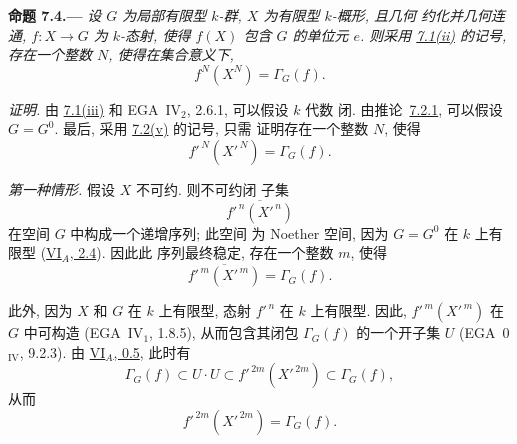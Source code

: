 
\medskip
{}\label{prop:sga3-VIB-7.4}%
\noindent\textbf{命题 7.4.---}
\emph{设 \(G\) 为局部有限型 \(k\)-群,
\(X\) 为有限型 \(k\)-概形, 且几何
约化并几何连通, \(f:X\to G\) 为
\(k\)-态射, 使得 \(f(X)\) 包含 \(G\) 的单位元
\(e\). 则采用
\hyperref[concl:sga3-VIB-7.1-ii]{7.1\textup{(ii)}} 的记号,
存在一个整数 \(N\), 使得在集合意义下,}
\label{form:sga3-VIB-7.4-stabilization}%
\[
  f^N(X^N)=\Gamma_G(f).
\]

\emph{证明.}
由 \hyperref[concl:sga3-VIB-7.1-iii]{7.1\textup{(iii)}} 和
EGA~IV\(_2\), 2.6.1, 可以假设 \(k\) 代数
闭. 由推论~\hyperref[cor:sga3-VIB-7.2.1]{7.2.1}, 可以假设
\(G=G^0\). 最后, 采用
\hyperref[rem:sga3-VIB-7.2-v]{7.2\textup{(v)}} 的记号, 只需
证明存在一个整数 \(N\), 使得
\[
  f'^{\,N}(X'^{\,N})=\Gamma_G(f).
\]

\emph{第一种情形.}
假设 \(X\) 不可约. 则不可约闭
子集
\[
  \overline{f'^{\,n}(X'^{\,n})}
\]
在空间 \(G\) 中构成一个递增序列; 此空间
为 Noether 空间, 因为 \(G=G^0\) 在 \(k\) 上有限型
(\hyperref[prop:sga3-VIA-2.4]{VI\(_A\), 2.4}). 因此此
序列最终稳定, 存在一个整数 \(m\), 使得
\[
  \overline{f'^{\,m}(X'^{\,m})}=\Gamma_G(f).
\]

此外, 因为 \(X\) 和 \(G\) 在 \(k\) 上有限型,
态射 \(f'^{\,n}\) 在 \(k\) 上有限型.
因此, \(f'^{\,m}(X'^{\,m})\) 在
\(G\) 中可构造 (EGA~IV\(_1\), 1.8.5), 从而包含其闭包
\(\Gamma_G(f)\) 的一个开子集 \(U\)
(EGA~0\(_{\mathrm{IV}}\), 9.2.3). 由
\hyperref[sga3:VIA:0.5]{VI\(_A\), 0.5}, 此时有
\label{form:sga3-VIB-7.4-first-case-chain}%
\[
  \Gamma_G(f)
  \subset U\cdot U
  \subset f'^{\,2m}(X'^{\,2m})
  \subset \Gamma_G(f),
\]
从而
\[
  f'^{\,2m}(X'^{\,2m})=\Gamma_G(f).
\]

